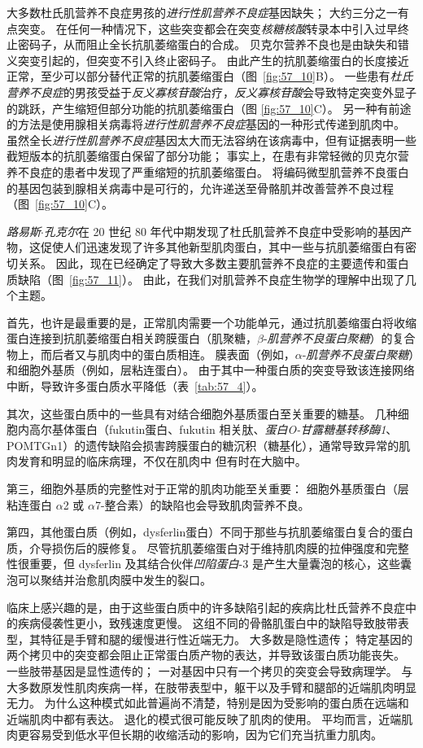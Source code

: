 大多数杜氏肌营养不良症男孩的\textit{进行性肌营养不良症}基因缺失；
大约三分之一有点突变。
在任何一种情况下，这些突变都会在突变\textit{核糖核酸}转录本中引入过早终止密码子，从而阻止全长抗肌萎缩蛋白的合成。
贝克尔营养不良也是由缺失和错义突变引起的，但突变不引入终止密码子。
由此产生的抗肌萎缩蛋白的长度接近正常，至少可以部分替代正常的抗肌萎缩蛋白（图~\ref{fig:57_10}B）。
一些患有\textit{杜氏营养不良症}的男孩受益于\textit{反义寡核苷酸}治疗，\textit{反义寡核苷酸}会导致特定突变外显子的跳跃，产生缩短但部分功能的抗肌萎缩蛋白（图 \ref{fig:57_10}C）。
另一种有前途的方法是使用腺相关病毒将\textit{进行性肌营养不良症}基因的一种形式传递到肌肉中。
虽然全长\textit{进行性肌营养不良症}基因太大而无法容纳在该病毒中，但有证据表明一些截短版本的抗肌萎缩蛋白保留了部分功能；
事实上，在患有非常轻微的贝克尔营养不良症的患者中发现了严重缩短的抗肌萎缩蛋白。
将编码微型肌营养不良蛋白的基因包装到腺相关病毒中是可行的，允许递送至骨骼肌并改善营养不良过程（图~\ref{fig:57_10}C）。


\textit{路易斯$\cdot$孔克尔}在 20 世纪 80 年代中期发现了杜氏肌营养不良症中受影响的基因产物，这促使人们迅速发现了许多其他新型肌肉蛋白，其中一些与抗肌萎缩蛋白有密切关系。
因此，现在已经确定了导致大多数主要肌营养不良症的主要遗传和蛋白质缺陷（图~\ref{fig:57_11}）。
由此，在我们对肌营养不良症生物学的理解中出现了几个主题。


首先，也许是最重要的是，正常肌肉需要一个功能单元，通过抗肌萎缩蛋白将收缩蛋白连接到抗肌萎缩蛋白相关跨膜蛋白（肌聚糖，$\beta $-\textit{肌营养不良蛋白聚糖}）的复合物上，而后者又与肌肉中的蛋白质相连。
膜表面（例如，$\alpha$-\textit{肌营养不良蛋白聚糖}）和细胞外基质（例如，层粘连蛋白）。
由于其中一种蛋白质的突变导致该连接网络中断，导致许多蛋白质水平降低（表~\ref{tab:57_4}）。


其次，这些蛋白质中的一些具有对结合细胞外基质蛋白至关重要的糖基。
几种细胞内高尔基体蛋白（fukutin蛋白、fukutin 相关肽、\textit{蛋白O-甘露糖基转移酶1}、POMTGn1）的遗传缺陷会损害跨膜蛋白的糖沉积（糖基化），通常导致异常的肌肉发育和明显的临床病理，不仅在肌肉中 但有时在大脑中。


第三，细胞外基质的完整性对于正常的肌肉功能至关重要：
细胞外基质蛋白（层粘连蛋白 $\alpha$2 或 $\alpha$7-整合素）的缺陷也会导致肌肉营养不良。


第四，其他蛋白质（例如，dysferlin蛋白）不同于那些与抗肌萎缩蛋白复合的蛋白质，介导损伤后的膜修复。
尽管抗肌萎缩蛋白对于维持肌肉膜的拉伸强度和完整性很重要，但 dysferlin 及其结合伙伴\textit{凹陷蛋白}-3 是产生大量囊泡的核心，这些囊泡可以聚结并治愈肌肉膜中发生的裂口。


临床上感兴趣的是，由于这些蛋白质中的许多缺陷引起的疾病比杜氏营养不良症中的疾病侵袭性更小，致残速度更慢。
这组不同的骨骼肌蛋白中的缺陷导致肢带表型，其特征是手臂和腿的缓慢进行性近端无力。
大多数是隐性遗传； 特定基因的两个拷贝中的突变都会阻止正常蛋白质产物的表达，并导致该蛋白质功能丧失。
一些肢带基因是显性遗传的；
一对基因中只有一个拷贝的突变会导致病理学。
与大多数原发性肌肉疾病一样，在肢带表型中，躯干以及手臂和腿部的近端肌肉明显无力。
为什么这种模式如此普遍尚不清楚，特别是因为受影响的蛋白质在远端和近端肌肉中都有表达。
退化的模式很可能反映了肌肉的使用。
平均而言，近端肌肉更容易受到低水平但长期的收缩活动的影响，因为它们充当抗重力肌肉。


